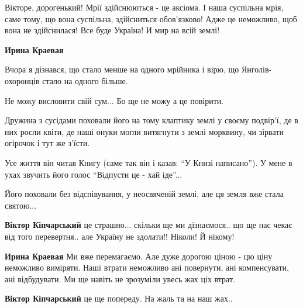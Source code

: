  
 
 
 
 

\qqSecCmt


Вікторе, дорогенький! Мрії здійснюються - це аксіома. І наша суспільна мрія,
саме тому, що вона суспільна, здійсниться обов'язково! Адже це неможливо, щоб
вона не здійснилася! Все буде Україна! И мир на всій землі!

\begin{itemize} %
\textbf{Ирина Краевая} 

Вчора я дізнався, що стало менше на одного мрійника і вірю, що
Янголів-охоронців стало на одного більше.

Не можу висловити свій сум... Бо ще не можу а це повірити.

Дружина з сусідами поховали його на тому клаптику землі у своєму подвір'ї, де в
них росли квіти, де наші онуки могли витягнути з землі морквину, чи зірвати
огірочок і тут же з'їсти.

Усе життя він читав Книгу (саме так він і казав: \enquote{У Книзі написано}). У мене в
ухах звучить його голос \enquote{Відпусти це - хай іде}...

Його поховали без відспівування, у неосвяченій землі, але ця земля вже стала
святою...

\textbf{Віктор Кіпчарський} це страшно... скільки ще ми дізнаємося.. що ще нас чекає від того перевертня.. але Україну не здолати!! Ніколи! Й нікому!

\textbf{Ирина Краевая} Ми вже перемагаємо. Але дуже дорогою ціною - цю ціну неможливо виміряти.
Наші втрати неможливо ані повернути, ані компенсувати, ані відбудувати.
Ми ще навіть не зрозуміли увесь жах ціх втрат.

\textbf{Віктор Кіпчарський} це ще попереду. На жаль та на наш жах..
\end{itemize} %
